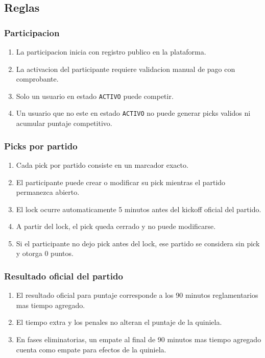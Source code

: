 \subsection{Reglas}

\subsubsection{Participacion}

\begin{enumerate}
  \item La participacion inicia con registro publico en la plataforma.
  \item La activacion del participante requiere validacion manual de pago con comprobante.
  \item Solo un usuario en estado \texttt{ACTIVO} puede competir.
  \item Un usuario que no este en estado \texttt{ACTIVO} no puede generar picks validos ni acumular puntaje competitivo.
\end{enumerate}

\subsubsection{Picks por partido}

\begin{enumerate}
  \item Cada pick por partido consiste en un marcador exacto.
  \item El participante puede crear o modificar su pick mientras el partido permanezca abierto.
  \item El lock ocurre automaticamente 5 minutos antes del kickoff oficial del partido.
  \item A partir del lock, el pick queda cerrado y no puede modificarse.
  \item Si el participante no dejo pick antes del lock, ese partido se considera sin pick y otorga 0 puntos.
\end{enumerate}

\subsubsection{Resultado oficial del partido}

\begin{enumerate}
  \item El resultado oficial para puntaje corresponde a los 90 minutos reglamentarios mas tiempo agregado.
  \item El tiempo extra y los penales no alteran el puntaje de la quiniela.
  \item En fases eliminatorias, un empate al final de 90 minutos mas tiempo agregado cuenta como empate para efectos de la quiniela.
\end{enumerate}

